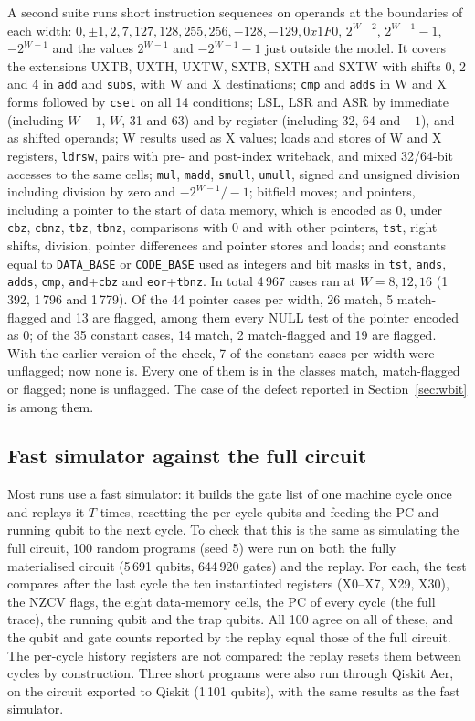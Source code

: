 \documentclass[11pt]{article}
\begin{document}
A second suite runs short instruction sequences on operands at the boundaries of each width:
$0, \pm1, 2, 7, 127, 128, 255, 256, -128, -129, 0x1F0$, $2^{W-2}$, $2^{W-1}-1$, $-2^{W-1}$ and the
values $2^{W-1}$ and $-2^{W-1}-1$ just outside the model. It covers the extensions UXTB, UXTH, UXTW,
SXTB, SXTH and SXTW with shifts 0, 2 and 4 in \texttt{add} and \texttt{subs}, with W and X destinations;
\texttt{cmp} and \texttt{adds} in W and X forms followed by \texttt{cset} on all 14 conditions;
LSL, LSR and ASR by immediate (including $W-1$, $W$, 31 and 63) and by register (including 32, 64 and
$-1$), and as shifted operands; W results used as X values; loads and stores of W and X registers,
\texttt{ldrsw}, pairs with pre- and post-index writeback, and mixed 32/64-bit accesses to the same
cells; \texttt{mul}, \texttt{madd}, \texttt{smull}, \texttt{umull}, signed and unsigned division
including division by zero and $-2^{W-1}/-1$; bitfield moves; and pointers, including a pointer
to the start of data memory, which is encoded as 0, under \texttt{cbz}, \texttt{cbnz}, \texttt{tbz},
\texttt{tbnz}, comparisons with 0 and with other pointers, \texttt{tst}, right shifts, division,
pointer differences and pointer stores and loads; and constants equal to \texttt{DATA\_BASE} or
\texttt{CODE\_BASE} used as integers and bit masks in \texttt{tst}, \texttt{ands}, \texttt{adds},
\texttt{cmp}, \texttt{and}+\texttt{cbz} and \texttt{eor}+\texttt{tbnz}. In total 4\,967 cases ran at
$W=8,12,16$ (1\,392, 1\,796 and 1\,779). Of the 44 pointer cases per width, 26 match, 5 match-flagged
and 13 are flagged, among them every NULL test of the pointer encoded as 0; of the 35 constant cases,
14 match, 2 match-flagged and 19 are flagged. With the earlier version of the check, 7 of the constant
cases per width were unflagged; now none is. Every one of them is in the classes match, match-flagged or flagged;
none is unflagged. The case of the defect reported in Section~\ref{sec:wbit} is among them.

\subsection{Fast simulator against the full circuit}

Most runs use a fast simulator: it builds the gate list of one machine cycle once and replays it
$T$ times, resetting the per-cycle qubits and feeding the PC and running qubit to the next cycle.
To check that this is the same as simulating the full circuit, 100 random programs (seed 5) were
run on both the fully materialised circuit (5\,691 qubits, 644\,920 gates) and the replay. For each,
the test compares after the last cycle the ten instantiated registers (X0--X7, X29, X30), the NZCV
flags, the eight data-memory cells, the PC of every cycle (the full trace), the running qubit and
the trap qubits. All 100 agree on all of these, and the qubit and gate counts reported by the replay
equal those of the full circuit. The per-cycle history registers are not compared: the replay resets
them between cycles by construction. Three short
programs were also run through Qiskit Aer, on the circuit exported to Qiskit (1\,101 qubits), with
the same results as the fast simulator.
\end{document}
